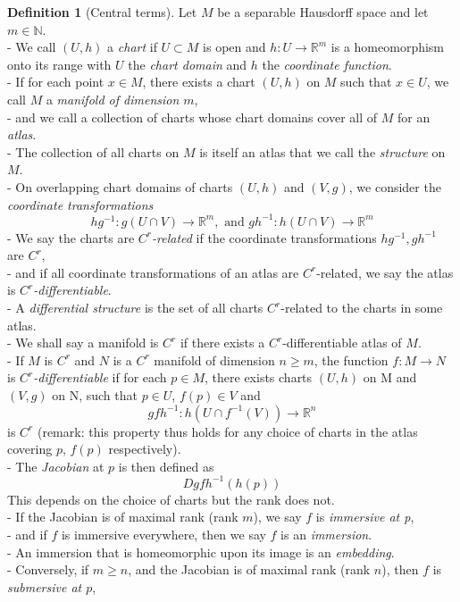 \documentclass[11pt, a4paper]{memoir}
\theoremstyle{plain}
\theoremstyle{definition}
\newtheorem{defn}{Definition}
\newcommand{\mN}{\mathbb{N}}
\newcommand{\mR}{\mathbb{R}}
\begin{document}
\begin{defn}[Central terms]
Let $M$ be a separable Hausdorff space and let $m\in \mN$.\\
- We call $(U,h)$ a \emph{chart} if $U\subset M$ is open and $h: U\to \mR^m$ is a homeomorphism onto its range with $U$ the \emph{chart domain} and $h$ the \emph{coordinate function}.\\
- If for each point $x\in M$, there exists a chart $(U,h)$ on $M$ such that $x\in U$, we call $M$ a \emph{manifold of dimension $m$},\\
- and we call a collection of charts whose chart domains cover all of $M$ for an \emph{atlas}.\\
- The collection of all charts on $M$ is itself an atlas that we call the \emph{structure} on $M$.\\
- On overlapping chart domains of charts $(U,h)$ and $(V,g)$, we consider the \emph{coordinate transformations}
$$hg^{-1}: g(U\cap V)\to \mR^m, \text{ and } gh^{-1}: h(U\cap V)\to \mR^m$$
- We say the charts are \emph{$C^r$-related} if the coordinate transformations $hg^{-1}, gh^{-1}$ are $C^r$,\\
- and if all coordinate transformations of an atlas are $C^r$-related, we say the atlas is \emph{$C^r$-differentiable}.\\
- A \emph{differential structure} is the set of all charts $C^r$-related to the charts in some atlas.\\
- We shall say a manifold is $C^r$ if there exists a $C^r$-differentiable atlas of $M$.\\
- If $M$ is $C^r$ and $N$ is a $C^r$ manifold of dimension $n\geq m$, the function $f: M\to N$ is \emph{$C^r$-differentiable} if for each $p\in M$, there exists charts $(U,h)$ on M and $(V,g)$ on N, such that $p\in U$, $f(p)\in V$ and 
$$gfh^{-1}: h(U\cap f^{-1}(V))\to \mR^n$$
is $C^r$ (remark: this property thus holds for any choice of charts in the atlas covering $p$, $f(p)$ respectively).\\
- The \emph{Jacobian} at $p$ is then defined as 
$$Dgfh^{-1}(h(p))$$
This depends on the choice of charts but the rank does not.\\ 
- If the Jacobian is of maximal rank (rank $m$), we say $f$ is \emph{immersive at p},\\
- and if $f$ is immersive everywhere, then we say $f$ is an \emph{immersion}.\\
- An immersion that is homeomorphic upon its image is an \emph{embedding}.\\
- Conversely, if $m\geq n$, and the Jacobian is of maximal rank (rank $n$), then $f$ is \emph{submersive at $p$},\\

\end{defn}
\end{document}
